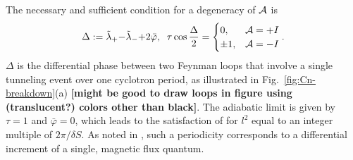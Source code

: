 \documentclass[aps, prb, showpacs, twocolumn, notitlepage, superscriptaddress]{revtex4-1}
\begin{document}




The necessary and sufficient condition for a degeneracy of ${\cal A}$ is 
\begin{align}
\Delta:= \tilde{\lambda}_+{-}\tilde{\lambda}_{-}{+}2\bar{\varphi},\;\;
\tau\cos\frac{\Delta}{2}= \begin{cases} 0, & {{\cal A}}=+I \\
                 \pm 1, & {\cal A} =-I\end{cases}.\label{c2breakdowndgncondition}
\end{align}
$\Delta$ is the differential phase between two Feynman loops  that involve a single tunneling event  over one cyclotron period, as illustrated in Fig.\ \ref{fig:Cn-breakdown}(a) \textbf{[might be good to draw loops in figure using (translucent?) colors other than black]}.
The adiabatic limit is given by $\tau{=}1$ and $\bar{\varphi}{=}0$, which leads to the satisfaction of  for $l^2$ equal to an integer multiple of $2\pi/\delta S$. As noted  in , such a periodicity  corresponds to a differential increment of a single, magnetic flux quantum. 
\end{document}

